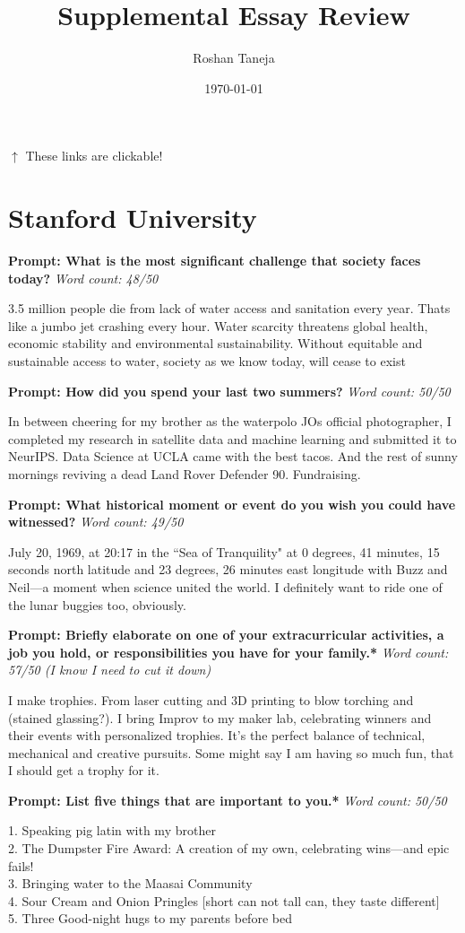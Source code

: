 \documentclass[10pt]{article}
\title{Supplemental Essay Review}
\author{Roshan Taneja}
\date{\today}
\newcommand{\mybox}[3]{
    \begin{minipage}{\textwidth} %
        \begin{tcolorbox}[colback=grey, colframe=black, boxrule=0.5mm, width=\textwidth, sharp corners=south, enhanced]
            \textbf{#1} \textit{#2}
        \end{tcolorbox}
        \vspace{-16pt}
        \begin{tcolorbox}[colback=white, colframe=black, boxrule=0.5mm, width=\textwidth, sharp corners=north, top=0pt, enhanced]
            \vspace{1em}
            \setlength{\parskip}{1em}
            #3
        \end{tcolorbox}
    \end{minipage}
    \vspace{1em}
}
\begin{document}
\maketitle

\tableofcontents

$\uparrow$ These links are clickable!




\section{Stanford University}

\mybox{Prompt: What is the most significant challenge that society faces today?}{Word count: 48/50}{
3.5 million people die from lack of water access and sanitation every year. Thats like a jumbo jet crashing every hour. Water scarcity threatens global health, economic stability and environmental sustainability. Without equitable and sustainable access to water, society as we know today, will cease to exist
}

\mybox{Prompt: How did you spend your last two summers?}{Word count: 50/50}{
In between cheering for my brother as the waterpolo JOs official photographer, I completed my research in  satellite data and machine learning and submitted it to NeurIPS. Data Science at UCLA came with the best tacos. And the rest of sunny mornings reviving a dead Land Rover Defender 90. Fundraising.
}

\mybox{Prompt: What historical moment or event do you wish you could have witnessed?}{Word count: 49/50}{
July 20, 1969, at 20:17 in the “Sea of Tranquility" at 0 degrees, 41 minutes, 15 seconds north latitude and 23 degrees, 26 minutes east longitude with Buzz and Neil—a moment when science united the world. I definitely want to ride one of the lunar buggies too, obviously.
}

\mybox{Prompt: Briefly elaborate on one of your extracurricular activities, a job you hold, or responsibilities you have for your family.*}{Word count: 57/50 (I know I need to cut it down)}{
I make trophies. From laser cutting and 3D printing to blow torching and (stained glassing?). I bring Improv to my maker lab, celebrating winners and their events with personalized trophies. It’s the perfect balance of technical, mechanical and creative pursuits. Some might say I am having so much fun, that I should get a trophy for it. 
}

\mybox{Prompt: List five things that are important to you.*}{Word count: 50/50}{
1. Speaking pig latin with my brother \\
2. The Dumpster Fire Award: A creation of my own, celebrating wins—and epic fails! \\
3. Bringing water to the Maasai Community \\
4. Sour Cream and Onion Pringles [short can not tall can, they taste different] \\
5. Three Good-night hugs to my parents before bed \\
}
\end{document}
